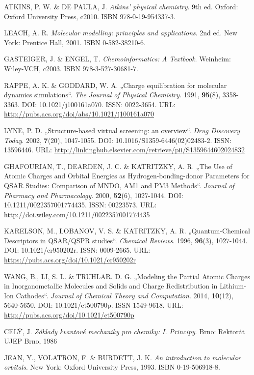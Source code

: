 \begin{thebibliography}{10}

ATKINS, P. W. \& DE PAULA, J. \textit{Atkins' physical chemistry}. 9th ed. Oxford: Oxford University Press, c2010. ISBN 978-0-19-954337-3.

LEACH, A. R. \textit{Molecular modelling: principles and applications}. 2nd ed. New York: Prentice Hall, 2001. ISBN 0-582-38210-6.

GASTEIGER, J. \& ENGEL, T. \textit{Chemoinformatics: A Textbook}. Weinheim: Wiley-VCH, c2003. ISBN 978-3-527-30681-7.

RAPPE, A. K. \& GODDARD, W. A. „Charge equilibration for molecular dynamics simulations“. \textit{The Journal of Physical Chemistry}. 1991, \textbf{95}(8), 3358-3363. DOI: 10.1021/j100161a070. ISSN: 0022-3654. URL: \url{http://pubs.acs.org/doi/abs/10.1021/j100161a070}

LYNE, P. D. „Structure-based virtual screening: an overview“. \textit{Drug Discovery Today}. 2002, \textbf{7}(20), 1047-1055. DOI: 10.1016/S1359-6446(02)02483-2. ISSN: 13596446. URL: \url{http://linkinghub.elsevier.com/retrieve/pii/S1359644602024832}

GHAFOURIAN, T., DEARDEN, J. C. \& KATRITZKY, A. R. „The Use of Atomic Charges and Orbital Energies as Hydrogen-bonding-donor Parameters for QSAR Studies: Comparison of MNDO, AM1 and PM3 Methods“. \textit{Journal of Pharmacy and Pharmacology}. 2000, \textbf{52}(6), 1027-1044. DOI: 10.1211/0022357001774435. ISSN: 00223573. URL:  \url{http://doi.wiley.com/10.1211/0022357001774435}

KARELSON, M., LOBANOV, V. S. \& KATRITZKY, A. R. „Quantum-Chemical Descriptors in QSAR/QSPR studies“. \textit{Chemical Reviews}. 1996, \textbf{96}(3), 1027-1044. DOI: 10.1021/cr950202r. ISSN: 0009-2665. URL: \url{https://pubs.acs.org/doi/10.1021/cr950202r}

WANG, B., LI, S. L. \& TRUHLAR. D. G. „Modeling the Partial Atomic Charges in Inorganometallic Molecules and Solids and Charge Redistribution in Lithium-Ion Cathodes“. \textit{Journal of Chemical Theory and Computation}. 2014, \textbf{10}(12), 5640-5650. DOI: 10.1021/ct500790p. ISSN 1549-9618. URL: \url{http://pubs.acs.org/doi/10.1021/ct500790p}

CELÝ, J. \textit{Základy kvantové mechaniky pro chemiky: I. Principy}. Brno: Rektorát UJEP Brno, 1986

JEAN, Y., VOLATRON, F. \& BURDETT, J. K. \textit{An introduction to molecular orbitals}. New York: Oxford University Press, 1993. ISBN 0-19-506918-8.

\end{thebibliography}


\cleardoublepage
